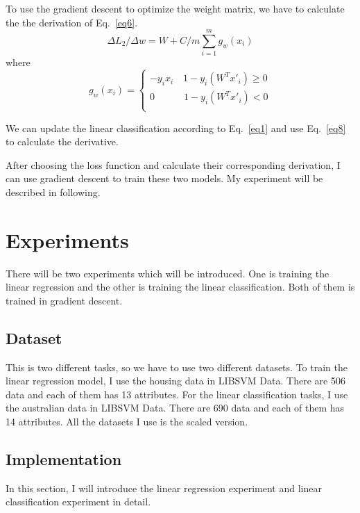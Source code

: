 \documentclass[journal, a4paper]{IEEEtran}
\begin{document}
To use the gradient descent to optimize the weight matrix, we have to calculate the the derivation of Eq.~\eqref{eq6}.
\begin{equation}
\Delta L_2 / \Delta w = W + C/m\sum_{i=1}^m g_w(x_i)
\label{eq7}
\end{equation}
where
\begin{equation}
g_w(x_i)=\begin{cases}
-y_ix_i\quad 1-y_i(W^Tx'_i) \geq 0 \\
0\quad \quad \quad 1-y_i(W^Tx'_i) < 0 \\
\end{cases}
\label{eq8}
\end{equation}

We can update the linear classification according to Eq.~\eqref{eq1} and use Eq.~\eqref{eq8} to calculate the derivative.

After choosing the loss function and calculate their corresponding derivation, I can use gradient descent to train these two models. My experiment will be described in following.

\section{Experiments}
There will be two experiments which will be introduced. One is training the linear regression and the other is training the linear classification. Both of them is trained in gradient descent.

\subsection{Dataset}
This is two different tasks, so we have to use two different datasets. To train the linear regression model, I use the housing data in LIBSVM Data. There are 506 data and each of them has 13 attributes. For the linear classification tasks, I use the australian data in LIBSVM Data. There are 690 data and each of them has 14 attributes. All the datasets I use is the scaled version.

\subsection{Implementation}
In this section, I will introduce the linear regression experiment and linear classification experiment in detail.
\end{document}
